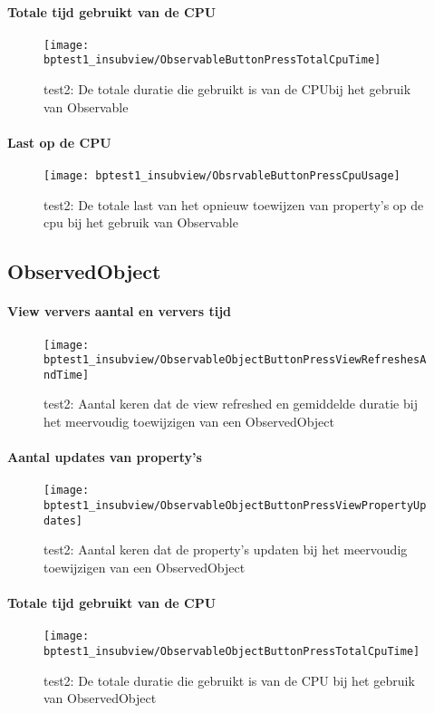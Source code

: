\paragraph{Totale tijd gebruikt van de CPU}
\begin{figure}[H]
    \centering
    \texttt{[image: bptest1\_insubview/ObservableButtonPressTotalCpuTime]} 
    \caption{test2: De totale duratie die gebruikt is van de CPUbij het gebruik van Observable}
    \label{fig:cpuUsageTimeObservable1}
\end{figure}
\paragraph{Last op de CPU}
\begin{figure}[H]
    \centering
    \texttt{[image: bptest1\_insubview/ObsrvableButtonPressCpuUsage]} 
    \caption{test2: De totale last van het opnieuw toewijzen van property's op de cpu bij het gebruik van Observable}
    \label{fig:cpuWeightObservable1}
\end{figure}

\subsection{ObservedObject}
\paragraph{View ververs aantal en ververs tijd}
\begin{figure}[H]
    \centering
    \texttt{[image: bptest1\_insubview/ObservableObjectButtonPressViewRefreshesAndTime]} 
    \caption{test2: Aantal keren dat de view refreshed en gemiddelde duratie bij het meervoudig toewijzigen van een ObservedObject}
    \label{fig:viewRefresheObservedObject1}
\end{figure}
\paragraph{Aantal updates van property's}
\begin{figure}[H]
    \centering
    \texttt{[image: bptest1\_insubview/ObservableObjectButtonPressViewPropertyUpdates]} 
    \caption{test2: Aantal keren dat de property's updaten bij het meervoudig toewijzigen van een ObservedObject}
    \label{fig:propertyUpdatesObservedObject1}
\end{figure}
\paragraph{Totale tijd gebruikt van de CPU}
\begin{figure}[H]
    \centering
    \texttt{[image: bptest1\_insubview/ObservableObjectButtonPressTotalCpuTime]} 
    \caption{test2: De totale duratie die gebruikt is van de CPU bij het gebruik van ObservedObject}
    \label{fig:cpuUsageTimeObservedObject1}
\end{figure}

